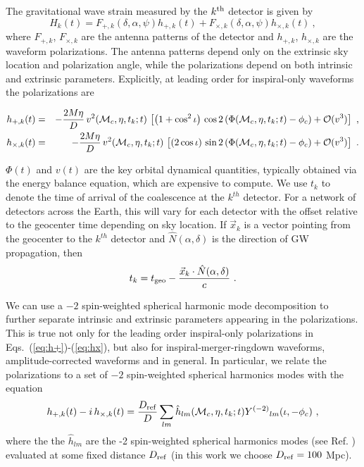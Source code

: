 The gravitational wave strain measured by the $k^{\rm th}$ detector is given by
\begin{equation} \label{eq:measured_strain}
H_k(t) = F_{+,k}(\delta, \alpha, \psi) h_{+,k}(t) 
+ F_{\times,k}(\delta, \alpha, \psi) h_{\times,k}(t)\ ,
\end{equation}
where $F_{+,k}$, $F_{\times,k}$ are the antenna patterns of the detector and $h_{+,k}$, $h_{\times,k}$
are the waveform polarizations. The antenna patterns depend only on the extrinsic sky location and polarization
angle, while the polarizations depend on both intrinsic and extrinsic parameters. Explicitly,
at leading order for inspiral-only waveforms the polarizations are
\begin{widetext}
\begin{eqnarray} \label{eq:polarizations}
h_{+,k}(t) &=& - \frac{2 M \eta}{D}\,v^2({{\cal M}_c},\eta,t_k;t)\,\left[ \left( 1 + \cos^2 \iota \right)\, \label{eq:h+}
	\cos 2 \left( \Phi({{\cal M}_c},\eta,t_k;t) - \phi_c \right) + {\cal O}(v^3)\right]\ ,\\
h_{\times,k}(t) &=& - \frac{2 M \eta}{D}\,v^2({{\cal M}_c},\eta,t_k;t)\,\left[ \left( 2 \cos \iota\right)\, \label{eq:hx}
	\sin 2 \left( \Phi({{\cal M}_c},\eta,t_k;t) - \phi_c \right) + {\cal O}(v^3)\right]\ .
\end{eqnarray}
\end{widetext}
$\Phi(t)$ and $v(t)$ are the key orbital dynamical quantities, typically obtained via the energy balance equation,
which are expensive to compute. We use $t_k$ to denote the time of arrival of the coalescence at the $k^{th}$ detector.
For a network of detectors across the Earth, this will vary for each detector with the offset relative to the geocenter
time depending on sky location. If $\vec{x}_k$ is a vector pointing from the geocenter to the $k^{th}$ detector
and $\hat{N}(\alpha,\delta)$ is the direction of GW propagation, then
\begin{equation} \label{eq:t_k}
t_k = t_{\rm geo} - \frac{\vec{x}_k \cdot \hat{N}(\alpha,\delta)}{c}\ .
\end{equation}

We can use a $-2$ spin-weighted spherical harmonic mode decomposition to further separate intrinsic and extrinsic
parameters appearing in the polarizations. 
This is true not only for the leading order inspiral-only polarizations in Eqs.~(\ref{eq:h+})-(\ref{eq:hx}),
but also for inspiral-merger-ringdown waveforms, amplitude-corrected waveforms and in general.
In particular, we relate the polarizations to a set of $-2$ spin-weighted 
spherical harmonics modes with the equation
\begin{equation} \label{eq:h:Expansion}
h_{+,k}(t) - i\,h_{\times,k}(t) = \frac{D_{\rm ref}}{D} \sum_{lm} \hat{h}_{lm}({{\cal M}_c},\eta,t_k;t)  Y^{(-2)}{}_{lm}(\iota,-\phi_c) \ ,
\end{equation}
where the the $\hat{h}_{lm}$ are the -2 spin-weighted spherical harmonics modes (see Ref. )
evaluated at some fixed distance $D_{\rm ref}$ (in this work we choose $D_{\rm ref} = 100$ Mpc).

